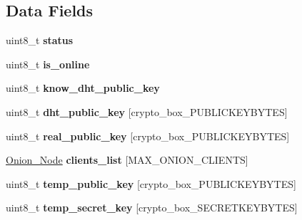 \subsection*{Data Fields}
\begin{DoxyCompactItemize}
\item 
\hypertarget{struct_onion___friend_ade818037fd6c985038ff29656089758d}{uint8\+\_\+t {\bfseries status}}\label{struct_onion___friend_ade818037fd6c985038ff29656089758d}

\item 
\hypertarget{struct_onion___friend_a6e539a068fed61fab47b62f467c1d208}{uint8\+\_\+t {\bfseries is\+\_\+online}}\label{struct_onion___friend_a6e539a068fed61fab47b62f467c1d208}

\item 
\hypertarget{struct_onion___friend_a1b66769a2b6f8e5c7306ffcfb7ac0956}{uint8\+\_\+t {\bfseries know\+\_\+dht\+\_\+public\+\_\+key}}\label{struct_onion___friend_a1b66769a2b6f8e5c7306ffcfb7ac0956}

\item 
\hypertarget{struct_onion___friend_ab2ecaa07625ad0ed5e07d3a1f0dcc939}{uint8\+\_\+t {\bfseries dht\+\_\+public\+\_\+key} \mbox{[}crypto\+\_\+box\+\_\+\+P\+U\+B\+L\+I\+C\+K\+E\+Y\+B\+Y\+T\+E\+S\mbox{]}}\label{struct_onion___friend_ab2ecaa07625ad0ed5e07d3a1f0dcc939}

\item 
\hypertarget{struct_onion___friend_a996dcaefa2a5954a199e2beb584c1feb}{uint8\+\_\+t {\bfseries real\+\_\+public\+\_\+key} \mbox{[}crypto\+\_\+box\+\_\+\+P\+U\+B\+L\+I\+C\+K\+E\+Y\+B\+Y\+T\+E\+S\mbox{]}}\label{struct_onion___friend_a996dcaefa2a5954a199e2beb584c1feb}

\item 
\hypertarget{struct_onion___friend_a6797ac2f59ba5ef59a8a70cd6515ca25}{\hyperlink{struct_onion___node}{Onion\+\_\+\+Node} {\bfseries clients\+\_\+list} \mbox{[}M\+A\+X\+\_\+\+O\+N\+I\+O\+N\+\_\+\+C\+L\+I\+E\+N\+T\+S\mbox{]}}\label{struct_onion___friend_a6797ac2f59ba5ef59a8a70cd6515ca25}

\item 
\hypertarget{struct_onion___friend_afc342de3f1533c0adfd762a6fd0d20ab}{uint8\+\_\+t {\bfseries temp\+\_\+public\+\_\+key} \mbox{[}crypto\+\_\+box\+\_\+\+P\+U\+B\+L\+I\+C\+K\+E\+Y\+B\+Y\+T\+E\+S\mbox{]}}\label{struct_onion___friend_afc342de3f1533c0adfd762a6fd0d20ab}

\item 
\hypertarget{struct_onion___friend_a6de303feb7b7892cc6a38228554b3e78}{uint8\+\_\+t {\bfseries temp\+\_\+secret\+\_\+key} \mbox{[}crypto\+\_\+box\+\_\+\+S\+E\+C\+R\+E\+T\+K\+E\+Y\+B\+Y\+T\+E\+S\mbox{]}}\label{struct_onion___friend_a6de303feb7b7892cc6a38228554b3e78}


\end{DoxyCompactItemize}

